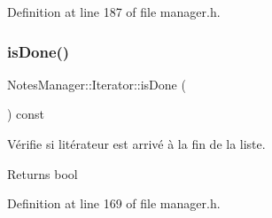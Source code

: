 Definition at line 187 of file manager.\+h.

\mbox{\label{class_notes_manager_1_1_iterator_a09b30631af5b7627b2b5a655a8ac450d}} 
\subsubsection{\texorpdfstring{is\+Done()}{isDone()}}
{\footnotesize\ttfamily Notes\+Manager\+::\+Iterator\+::is\+Done (\begin{DoxyParamCaption}{ }\end{DoxyParamCaption}) const\hspace{0.3cm}{\ttfamily [inline]}}



Vérifie si l\textquotesingle{}itérateur est arrivé à la fin de la liste. 

\begin{DoxyReturn}{Returns}
bool 
\end{DoxyReturn}


Definition at line 169 of file manager.\+h.

